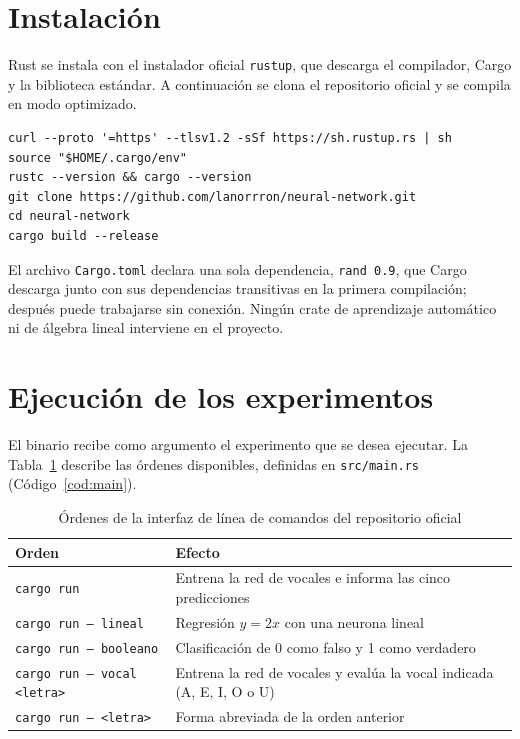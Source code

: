 \section{Instalación}
Rust se instala con el instalador oficial \texttt{rustup}, que descarga el compilador, Cargo y la biblioteca estándar. A continuación se clona el repositorio oficial y se compila en modo optimizado.

\begin{lstlisting}[language={},numbers=none,caption={Instalación de Rust y obtención del repositorio oficial},label=cod:instalacion]
curl --proto '=https' --tlsv1.2 -sSf https://sh.rustup.rs | sh
source "$HOME/.cargo/env"
rustc --version && cargo --version
git clone https://github.com/lanorrron/neural-network.git
cd neural-network
cargo build --release
\end{lstlisting}

El archivo \texttt{Cargo.toml} declara una sola dependencia, \texttt{rand 0.9}, que Cargo descarga junto con sus dependencias transitivas en la primera compilación; después puede trabajarse sin conexión. Ningún crate de aprendizaje automático ni de álgebra lineal interviene en el proyecto.

\section{Ejecución de los experimentos}
El binario recibe como argumento el experimento que se desea ejecutar. La Tabla~\ref{tab:cli} describe las órdenes disponibles, definidas en \texttt{src/main.rs} (Código~\ref{cod:main}).

\begin{table}[!htbp]
\caption{Órdenes de la interfaz de línea de comandos del repositorio oficial}\label{tab:cli}
\small
\begin{tabularx}{\textwidth}{@{}l >{\raggedright\arraybackslash}X@{}}
\toprule
Orden & Efecto \\
\midrule
\texttt{cargo run} & Entrena la red de vocales e informa las cinco predicciones \\
\texttt{cargo run -- lineal} & Regresión $y=2x$ con una neurona lineal \\
\texttt{cargo run -- booleano} & Clasificación de 0 como falso y 1 como verdadero \\
\texttt{cargo run -- vocal <letra>} & Entrena la red de vocales y evalúa la vocal indicada (A, E, I, O o U) \\
\texttt{cargo run -- <letra>} & Forma abreviada de la orden anterior \\
\bottomrule
\end{tabularx}
\end{table}

